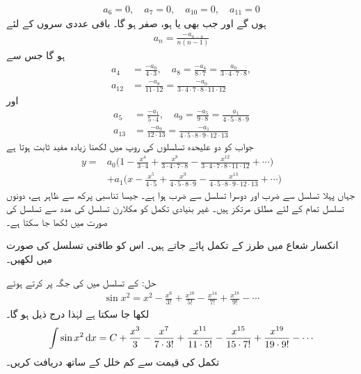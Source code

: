 \begin{align*}
a_6=0,\quad a_7=0,\quad a_{10}=0,\quad a_{11}=0
\end{align*}
ہوں گے اور جب بھی  یا  ہو،  صفر ہو گا۔ باقی عددی سروں کے لئے 
\begin{align*}
a_n=\frac{-a_{n-4}}{n(n-1)}
\end{align*}
ہو گا جس سے
\begin{align*}
a_4&=\frac{-a_0}{4\cdot 3},\quad a_8=\frac{-a_4}{8\cdot 7}=\frac{a_0}{3\cdot 4\cdot 7\cdot 8},\\
a_{12}&=\frac{-a_8}{11\cdot 12}=\frac{-a_0}{3\cdot 4\cdot 7\cdot 8\cdot 11\cdot 12}
\end{align*}
اور
\begin{align*}
a_5&=\frac{-a_1}{5\cdot 4},\quad a_9=\frac{-a_5}{9\cdot 8}=\frac{a_1}{4\cdot 5\cdot 8\cdot 9}\\
a_{13}&=\frac{-a_9}{12\cdot 13}=\frac{-a_1}{4\cdot 5\cdot 8\cdot 9\cdot 12\cdot 13}
\end{align*}
جواب کو دو علیحدہ تسلسلوں کی روپ میں لکھنا زیادہ مفید ثابت ہوتا ہے
\begin{align*}
y=&a_0\big(1-\frac{x^4}{3\cdot 4}+\frac{x^8}{3\cdot 4\cdot 7\cdot 8}-\frac{x^{12}}{3\cdot4\cdot 7\cdot 8\cdot 11\cdot 12}+\cdots\big)\\
&+a_1\big(x-\frac{x^5}{4\cdot 5}+\frac{x^9}{4\cdot 5\cdot 8\cdot 9}-\frac{x^{13}}{4\cdot 5\cdot 8\cdot 9\cdot 12\cdot 13}+\cdots\big)
\end{align*}
جہاں  پہلا تسلسل  سے ضرب اور دوسرا تسلسل  سے ضرب ہوا ہے۔ جیسا تناسبی پرکھ سے ظاہر ہے، دونوں تسلسل تمام  کے لئے مطلق مرتکز ہیں۔
غیر بنیادی تکمل کو مکلارن تسلسل کی مدد سے تسلسل کی صورت میں لکھا جا سکتا ہے۔

انکسار شعاع  میں  طرز کے تکمل پائے جاتے ہیں۔ اس کو طاقتی تسلسل کی صورت میں لکھیں۔

حل:\quad
{} کے تسلسل میں  کی جگہ  پر کرتے ہوئے
\begin{align*}
\sin x^2=x^2-\frac{x^6}{3!}+\frac{x^{10}}{5!}-\frac{x^{14}}{7!}+\frac{x^{18}}{9!}-\cdots
\end{align*}
لکھا جا سکتا ہے لہٰذا درج ذیل ہو گا۔
\begin{align*}
\int \sin x^2\dif x=C+\frac{x^3}{3}-\frac{x^7}{7\cdot 3!}+\frac{x^{11}}{11\cdot 5!}-\frac{x^{15}}{15\cdot 7!}+\frac{x^{19}}{19\cdot 9!}-\cdots
\end{align*}
تکمل  کی قیمت  سے کم خلل کے ساتھ دریافت کریں۔

